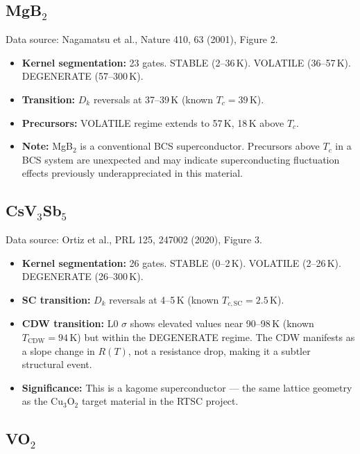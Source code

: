 \documentclass[11pt,letterpaper]{article}
\begin{document}
\subsection{MgB$_2$}

Data source: Nagamatsu et al., Nature 410, 63 (2001), Figure 2.

\begin{itemize}
  \item \textbf{Kernel segmentation:} 23 gates.
    STABLE (2--36\,K). VOLATILE (36--57\,K). DEGENERATE (57--300\,K).
  \item \textbf{Transition:} $D_k$ reversals at 37--39\,K (known $T_c = 39$\,K).
  \item \textbf{Precursors:} VOLATILE regime extends to 57\,K, 18\,K above $T_c$.
  \item \textbf{Note:} MgB$_2$ is a conventional BCS superconductor.
    Precursors above $T_c$ in a BCS system are unexpected and may
    indicate superconducting fluctuation effects previously
    underappreciated in this material.
\end{itemize}

\subsection{CsV$_3$Sb$_5$}

Data source: Ortiz et al., PRL 125, 247002 (2020), Figure 3.

\begin{itemize}
  \item \textbf{Kernel segmentation:} 26 gates.
    STABLE (0--2\,K). VOLATILE (2--26\,K). DEGENERATE (26--300\,K).
  \item \textbf{SC transition:} $D_k$ reversals at 4--5\,K (known $T_{c,\text{SC}} = 2.5$\,K).
  \item \textbf{CDW transition:} L0 $\sigma$ shows elevated values
    near 90--98\,K (known $T_{\text{CDW}} = 94$\,K) but within the
    DEGENERATE regime. The CDW manifests as a slope change in $R(T)$,
    not a resistance drop, making it a subtler structural event.
  \item \textbf{Significance:} This is a kagome superconductor ---
    the same lattice geometry as the Cu$_3$O$_2$ target material in
    the RTSC project.
\end{itemize}

\subsection{VO$_2$}
\end{document}
